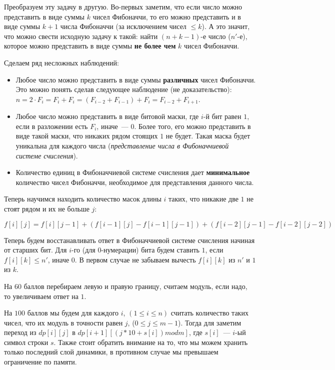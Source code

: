 \documentclass[12pt]{article}
\begin{document}

Преобразуем эту задачу в другую. Во-первых заметим, что если число можно представить в виде суммы $k$ чисел Фибоначчи, то его можно представить и
в виде суммы $k+1$ числа Фибоначчи (за исключением чисел $\le k$). А это значит, что можно свести исходную задачу к такой: найти $(n+k-1)$-е число ($n'$-е),
которое можно представить в виде суммы \textbf{не более чем} $k$ чисел Фибоначчи.

Сделаем ряд несложных наблюдений:
\begin{itemize}
	\item 
	Любое число можно представить в виде суммы \textbf{различных} чисел Фибоначчи.
	Это можно понять сделав следующее наблюдение (не доказательство):
	$n = 2 \cdot F_i = F_i + F_i = (F_{i-2} + F_{i-1}) + F_i = F_{i-2} + F_{i+1}$.
	\item
	Любое число можно представить в виде битовой маски, где $i$-й бит равен $1$, если в разложении есть $F_i$, иначе~--- $0$.
	Более того, его можно представить в виде такой маски, что никаких рядом стоящих $1$ не будет. Такая маска будет уникальна
	для каждого числа (\textit{представление числа в Фибоначчиевой системе счисления}).
	\item
	Количество единиц в Фибоначчиевой системе счисления дает \textbf{минимальное} количество чисел Фибоначчи, необходимое для представления
	данного числа.
\end{itemize}

Теперь научимся находить количество масок длины $i$ таких, что никакие две $1$ не стоят рядом и их не больше $j$:

$f[i][j] = f[i][j - 1] + (f[i - 1][j] - f[i - 1][j - 1]) + (f[i - 2][j - 1] - f[i - 2][j - 2])$

Теперь будем восстанавливать ответ в Фибоначчиевой системе счисления начиная от старших бит. Для $i$-го (для 0-нумерации) бита будем ставить $1$, если
$f[i][k] \le n'$, иначе $0$. В первом случае не забываем вычесть $f[i][k]$ из $n'$ и $1$ из $k$.

\EndEditorial


На $60$ баллов перебираем левую и правую границу, считаем модуль, если надо, то увеличиваем ответ на $1$.

На $100$ баллов мы будем для каждого $i$, $(1 \le i \le n)$ считать количество таких чисел, что их модуль в точности равен $j$, ($0 \le j \le m - 1$).
Тогда для заметим переход из $dp[i][j]$ в $dp[i + 1][(j * 10 + s[i]) mod m]$, где $s[i]$~--- $i$-ый символ строки $s$.
Также стоит обратить внимание на то, что мы можем хранить только последний слой динамики, в противном случае мы превышаем ограничение по памяти.
\end{document}
